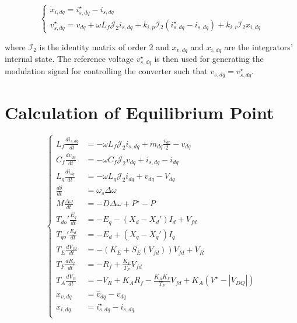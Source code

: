 \begin{equation}
    \begin{cases}
        \dot{x}_{i,dq} = i_{s,dq}^{\star} - i_{s,dq}\\
        v_{s,dq}^{\star} = v_{dq} + \omega L_f \mathcal{J}_2 i_{s,dq} + k_{i,p}\mathcal{I}_2 (i_{s,dq}^{\star} - i_{s,dq}) + k_{i,i}\mathcal{I}_2 x_{i,dq} 
    \end{cases}
    \label{eq:current_control}
\end{equation}

\noindent where $\mathcal{I}_2$ is the identity matrix of order 2 and $x_{v,dq}$
and $x_{i,dq}$ are the integrators' internal state. The reference voltage
$v_{s,dq}^{\star}$ is then used for generating the modulation signal for
controlling the converter such that $v_{s,dq} = v_{s,dq}^{\star}$.

\section{Calculation of Equilibrium Point}


\begin{equation}
    \begin{cases}
        L_f \frac{di_{s,dq}}{dt} &= -\omega L_f \mathcal{J}_2 i_{s,dq} + m_{dq}\frac{v_{dc}}{2} - v_{dq}\\
        C_f \frac{dv_{dq}}{dt} &= -\omega C_f \mathcal{J}_2 v_{dq} + i_{s,dq} - i_{dq}\\
        L_g \frac{di_{dq}}{dt} &= -\omega L_g \mathcal{J}_2 i_{dq} + v_{dq} - V_{dq}\\
        \frac{d\delta}{dt} &= \omega_s \Delta\omega\\
        M\frac{\Delta\omega}{dt} &= -D\Delta\omega + P^{\star} - P\\
        T_{do}' \frac{E_q}{dt} &= -E_q - (X_d - X_d')I_d + V_{fd}\\
        T_{qo}' \frac{E_d}{dt} &= -E_d + (X_q - X_q')I_q\\
        T_E \frac{dV_{fd}}{dt} &= -\left(K_E + S_E(V_{fd})\right)V_{fd} + V_R \\
        T_F \frac{dR_f}{dt} &= -R_f + \frac{K_F}{T_F}V_{fd} \\
        T_A \frac{dV_R}{dt} &= -V_R + K_A R_f - \frac{K_A K_F}{T_F}V_{fd} + K_A (V^{\star} - |V_{DQ}|)\\
        \dot{x}_{v,dq} &= \hat{v}_{dq} - v_{dq}\\
        \dot{x}_{i,dq} &= i_{s,dq}^{\star} - i_{s,dq}\\
    \end{cases}
    \label{eq:complete_model}
\end{equation}

